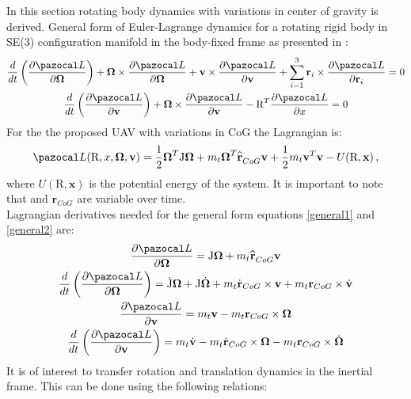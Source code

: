 In this section rotating body dynamics with variations in center of gravity is derived.
General form of Euler-Lagrange dynamics for a rotating rigid body in SE(3) configuration manifold in the body-fixed frame as presented in \cite{LeeModel}:
\begin{gather}
	\frac{d}{dt} \left( \frac{\partial \La}{\partial \mb{\Omega}} \right)
	+ \mb{\Omega} \times \frac{\partial \La}{\partial \mb{\Omega}} 
	+ \textbf{v} \times \frac{\partial \La}{\partial \textbf{v}} 
	+ \sum_{i=1}^{3} \textbf{r}_i \times \frac{\partial \La}{\partial \textbf{r}_i} = 0 \label{general1}\\
	\frac{d}{dt} \left( \frac{\partial \La}{\partial \textbf{v}} \right)
	+ \mb{\Omega} \times \frac{\partial \La}{\partial \textbf{v}} 
	- \text{R}^T \frac{\partial \La}{\partial x} = 0 \label{general2}
\end{gather}
For the the proposed UAV with variations in CoG the Lagrangian is:
\begin{equation}
	\La(\text{R},x,\mb{\Omega},\textbf{v}) = \frac{1}{2}\mb{\Omega}^T\text{J}\mb{\Omega} + m_t \mb{\Omega}^T \reallywidehat{\textbf{r}}_{CoG}\textbf{v} + \frac{1}{2}m_t\textbf{v}^T\textbf{v} - U(\text{R},\textbf{x}) \, ,
\end{equation}
where $U(\text{R}, \textbf{x})$ is the potential energy of the system. It is important to note that  and $\textbf{r}_{CoG}$ are variable over time. \\
Lagrangian derivatives needed for the general form equations \ref{general1} and \ref{general2} are:
\begin{gather}
	\frac{\partial \La}{\partial \mb{\Omega}} = \text{J}\mb{\Omega} + m_t \reallywidehat{\textbf{r}}_{CoG}\textbf{v} \label{d1}\\ 
	\frac{d}{dt} \left( \frac{\partial \La}{\partial \mb{\Omega}} \right) = \dot{\text{J}} \mb{\Omega} + \text{J} \dot{\mb{\Omega}} + m_t \dot{\textbf{r}}_{CoG} \times \textbf{v} + m_t \textbf{r}_{CoG} \times \dot{\textbf{v}} \label{d2}\\ 
	\frac{\partial \La}{\partial \textbf{v}} = m_t\textbf{v} - m_t\textbf{r}_{CoG} \times \mb{\Omega} \label{d3}\\ 
	\frac{d}{dt} \left( \frac{\partial \La}{\partial \textbf{v}} \right) = m_t\dot{\textbf{v}} - m_t\dot{\textbf{r}}_{CoG} \times \mb{\Omega} - m_t \textbf{r}_{CoG} \times \dot{\mb{\Omega}} \label{d4}
\end{gather}
It is of interest to transfer rotation and translation dynamics in the inertial frame. This can be done using the following relations:
